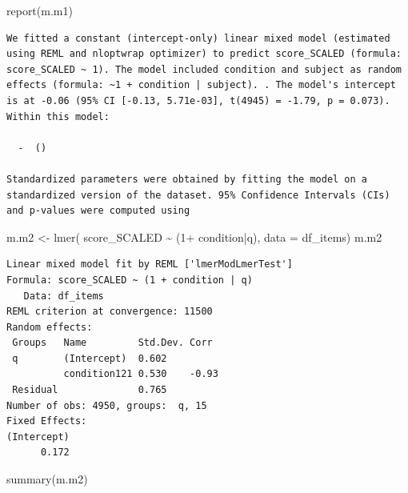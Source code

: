 \documentclass[
  letterpaper,
  DIV=11,
  numbers=noendperiod]{scrreprt}
\newenvironment{Shaded}{\begin{snugshade}}{\end{snugshade}}
\newcommand{\AttributeTok}[1]{\textcolor[rgb]{0.40,0.45,0.13}{#1}}
\newcommand{\DecValTok}[1]{\textcolor[rgb]{0.68,0.00,0.00}{#1}}
\newcommand{\FunctionTok}[1]{\textcolor[rgb]{0.28,0.35,0.67}{#1}}
\newcommand{\NormalTok}[1]{\textcolor[rgb]{0.00,0.23,0.31}{#1}}
\newcommand{\OtherTok}[1]{\textcolor[rgb]{0.00,0.23,0.31}{#1}}
\newcommand{\SpecialCharTok}[1]{\textcolor[rgb]{0.37,0.37,0.37}{#1}}
\begin{document}
\begin{Shaded}
\begin{Highlighting}[]
\FunctionTok{report}\NormalTok{(m.m1)}
\end{Highlighting}
\end{Shaded}

\begin{verbatim}
We fitted a constant (intercept-only) linear mixed model (estimated using REML and nloptwrap optimizer) to predict score_SCALED (formula: score_SCALED ~ 1). The model included condition and subject as random effects (formula: ~1 + condition | subject). . The model's intercept is at -0.06 (95% CI [-0.13, 5.71e-03], t(4945) = -1.79, p = 0.073). Within this model:

  -  ()

Standardized parameters were obtained by fitting the model on a standardized version of the dataset. 95% Confidence Intervals (CIs) and p-values were computed using 
\end{verbatim}

\begin{Shaded}
\begin{Highlighting}[]
\NormalTok{m.m2 }\OtherTok{\textless{}{-}} \FunctionTok{lmer}\NormalTok{( score\_SCALED }\SpecialCharTok{\textasciitilde{}}\NormalTok{ (}\DecValTok{1}\SpecialCharTok{+}\NormalTok{ condition}\SpecialCharTok{|}\NormalTok{q), }\AttributeTok{data =}\NormalTok{ df\_items)}
\NormalTok{m.m2}
\end{Highlighting}
\end{Shaded}

\begin{verbatim}
Linear mixed model fit by REML ['lmerModLmerTest']
Formula: score_SCALED ~ (1 + condition | q)
   Data: df_items
REML criterion at convergence: 11500
Random effects:
 Groups   Name         Std.Dev. Corr 
 q        (Intercept)  0.602         
          condition121 0.530    -0.93
 Residual              0.765         
Number of obs: 4950, groups:  q, 15
Fixed Effects:
(Intercept)  
      0.172  
\end{verbatim}

\begin{Shaded}
\begin{Highlighting}[]
\FunctionTok{summary}\NormalTok{(m.m2)}
\end{Highlighting}
\end{Shaded}
\end{document}
